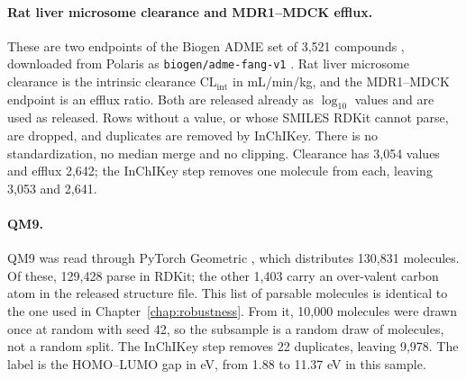 \paragraph{Rat liver microsome clearance and MDR1--MDCK efflux.} These are two endpoints of the Biogen ADME set of 3,521 compounds \citep{fang2023}, downloaded from Polaris as \texttt{biogen/adme-fang-v1} \citep{polaris}. Rat liver microsome clearance is the intrinsic clearance $\mathrm{CL_{int}}$ in mL/min/kg, and the MDR1--MDCK endpoint is an efflux ratio. Both are released already as $\log_{10}$ values and are used as released. Rows without a value, or whose SMILES RDKit cannot parse, are dropped, and duplicates are removed by InChIKey. There is no standardization, no median merge and no clipping. Clearance has 3,054 values and efflux 2,642; the InChIKey step removes one molecule from each, leaving 3,053 and 2,641.

\paragraph{QM9.} QM9 \citep{Ramakrishnan2014, qm9_dataset} was read through PyTorch Geometric \citep{pytorchGeometric}, which distributes 130,831 molecules. Of these, 129,428 parse in RDKit; the other 1,403 carry an over-valent carbon atom in the released structure file. This list of parsable molecules is identical to the one used in Chapter~\ref{chap:robustness}. From it, 10,000 molecules were drawn once at random with seed 42, so the subsample is a random draw of molecules, not a random split. The InChIKey step removes 22 duplicates, leaving 9,978. The label is the HOMO--LUMO gap in eV, from 1.88 to 11.37 eV in this sample.

